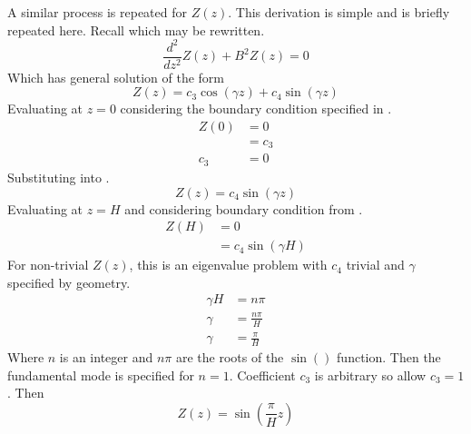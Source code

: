   A similar process is repeated for $Z(z)$. This derivation is simple and is
  briefly repeated here. Recall  which may be rewritten.
  \begin{equation}
    \frac{d^2}{dz^2} Z(z) + B^2 Z(z) = 0
  \end{equation}
  Which has general solution of the form
  \begin{equation}
    \label{eq:finite_cyl_z_general}
    Z(z) = c_3 \cos(\gamma z) + c_4 \sin(\gamma z)
  \end{equation}
  Evaluating  at $z=0$ considering the boundary
  condition specified in .
  \begin{align}
    Z(0) &= 0 \\
    &= c_3 \\
    \label{eq:finite_cyl_c3}
    c_3 &= 0
  \end{align}
  Substituting  into .
  \begin{equation}
    \label{eq:finite_cyl_z_sin}
    Z(z) = c_4 \sin(\gamma z)
  \end{equation}
  Evaluating  at $z=H$ and considering boundary
  condition from .
  \begin{align}
    Z(H) &= 0 \\
    &= c_4 \sin(\gamma H)
  \end{align}
  For non-trivial $Z(z)$, this is an eigenvalue problem with $c_4$ trivial and
  $\gamma$ specified by geometry. 
  \begin{align}
    \gamma H &= n \pi \\
    \gamma &= \frac{n \pi}{H} \\
    \label{eq:finite_cyl_gamma}
    \gamma &= \frac{\pi}{H}
  \end{align}
  Where $n$ is an integer and $n \pi$ are the roots of the $\sin()$ function.
  Then the fundamental mode is specified for $n=1$. Coefficient $c_3$ is
  arbitrary so allow $c_3 = 1$. Then
  \begin{equation}
    \label{eq:finite_cyl_Z}
    Z(z) = \sin\left(\frac{\pi}{H} z\right)
  \end{equation}

